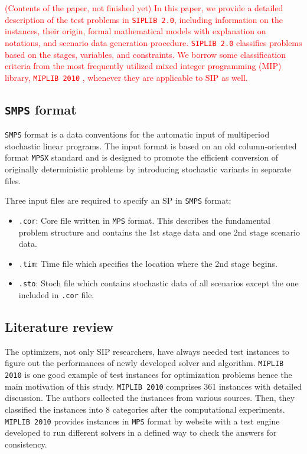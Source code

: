 \textcolor{red}{(Contents of the paper, not finished yet) In this paper, we provide a detailed description of the test problems in \texttt{SIPLIB 2.0}, including information on the instances, their origin, formal mathematical models with explanation on notations, and scenario data generation procedure. \texttt{SIPLIB 2.0} classifies problems based on the stages, variables, and constraints. We borrow some classification criteria from the most frequently utilized mixed integer programming (MIP) library, \texttt{MIPLIB 2010} \cite{MIPLIB}, whenever they are applicable to SIP as well.}

\subsection{\texttt{SMPS} format} \label{subsec:smps}
\texttt{SMPS} format \cite{SMPS} is a data conventions for the automatic input of multiperiod stochastic linear programs. The input format is based on an old column-oriented format \texttt{MPSX} standard and is designed to promote the efficient conversion of originally deterministic problems by introducing stochastic variants in separate files. 

Three input files are required to specify an SP in \texttt{SMPS} format:
\begin{itemize}
	\item \texttt{.cor}: Core file written in \texttt{MPS} format. This describes the fundamental problem structure and contains the 1st stage data and one 2nd stage scenario data.
	\item \texttt{.tim}: Time file which specifies the location where the 2nd stage begins.
	\item \texttt{.sto}: Stoch file which contains stochastic data of all scenarios except the one included in \texttt{.cor} file.
\end{itemize}

\subsection{Literature review} \label{subsec:literaturereview}
The optimizers, not only SIP researchers, have always needed test instances to figure out the performances of newly developed solver and algorithm. \texttt{MIPLIB 2010} \cite{MIPLIB} is one good example of test instances for optimization problems hence the main motivation of this study. \texttt{MIPLIB 2010} comprises 361 instances with detailed discussion. The authors collected the instances from various sources. Then, they classified the instances into 8 categories after the computational experiments. \texttt{MIPLIB 2010} provides instances in \texttt{MPS} format by website with a test engine developed to run different solvers in a defined way to check the answers for consistency. 

